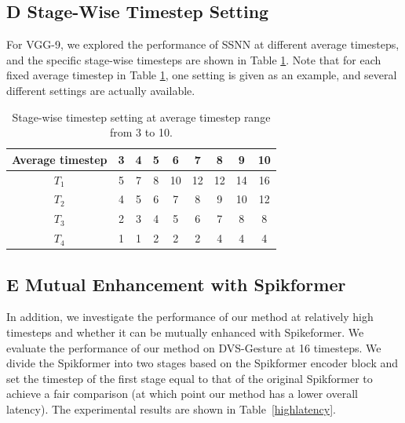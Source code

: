 \documentclass[letterpaper]{article} %
\begin{document}
\subsection{D Stage-Wise Timestep Setting}
For VGG-9, we explored the performance of SSNN at different average timesteps, and the specific stage-wise timesteps are shown in Table \ref{timestep setting}. Note that for each fixed average timestep in Table \ref{timestep setting}, one setting is given as an example, and several different settings are actually available.
\begin{table}[!tb]
 \centering
 \begin{tabular}{ccccccccc}
 \hline
 Average timestep & 3 & 4 & 5 & 6 & 7 & 8 & 9 & 10\\
  \hline
  $T_1$ & 5 & 7 & 8 & 10 & 12 & 12 & 14 & 16\\
  $T_2$ & 4 & 5 & 6 & 7 & 8 & 9 & 10 & 12\\
  $T_3$ & 2 & 3 & 4 & 5 & 6 & 7 & 8 & 8\\
  $T_4$ & 1 & 1 & 2 & 2 & 2 & 4 & 4 & 4\\
  \hline
 \end{tabular}
\caption{Stage-wise timestep setting at average timestep range from 3 to 10.}
 \label{timestep setting}
\end{table}

\subsection{E Mutual Enhancement with Spikformer}
In addition, we investigate the performance of our method at relatively high timesteps and whether it can be mutually enhanced with Spikeformer. We evaluate the performance of our method on DVS-Gesture at 16 timesteps. We divide the Spikformer into two stages based on the Spikformer encoder block and set the timestep of the first stage equal to that of the original Spikformer to achieve a fair comparison (at which point our method has a lower overall latency). The experimental results are shown in Table~\ref{highlatency}.
\end{document}
